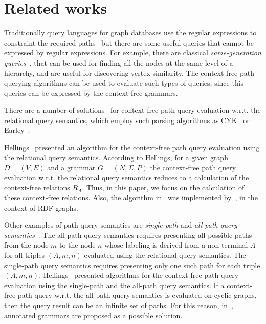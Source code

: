 \section{Related works} \label{section_related}
Traditionally query languages for graph databases use the regular expressions to constraint the required paths~\cite{reutter2017regular, fan2011adding, abiteboul1997regular, nole2016regular, graphDB} but there are some useful queries that cannot be expressed by regular expressions. For example, there are classical \textit{same-generation queries}~\cite{FndDB}, that can be used for finding all the nodes at the same level of a hierarchy, and are useful for discovering vertex similarity. The context-free path querying algorithms can be used to evaluate such types of queries, since this queries can be expressed by the context-free grammars.  

There are a number of solutions~\cite{hellingsRelational, GraphQueryWithEarley, RDF} for context-free path query evaluation w.r.t. the relational query semantics, which employ such parsing algorithms as CYK~\cite{kasami, younger} or Earley~\cite{Grune}.

Hellings~\cite{hellingsRelational} presented an algorithm for the context-free path query evaluation using the relational query semantics. According to Hellings, for a given graph $D = (V, E)$ and a grammar $G = (N, \Sigma, P)$ the context-free path query evaluation w.r.t. the relational query semantics reduces to a calculation of the context-free relations $R_A$. Thus, in this paper, we focus on the calculation of these context-free relations. Also, the algorithm in~\cite{hellingsRelational} was implemented by~\cite{RDF}, in the context of RDF graphs.

Other examples of path query semantics are \textit{single-path} and \textit{all-path query semantics}~\cite{hellingsPathQuerying}. The all-path query semantics requires presenting all possible paths from the node $m$ to the node $n$ whose labeling is derived from a non-terminal $A$ for all triples $(A, m, n)$ evaluated using the relational query semantics. The single-path query semantics requires presenting only one such path for each triple $(A, m, n)$. Hellings~\cite{hellingsPathQuerying} presented algorithms for the context-free path query evaluation using the single-path and the all-path query semantics. If a context-free path query w.r.t. the all-path query semantics is evaluated on cyclic graphs, then the query result can be an infinite set of paths. For this reason, in~\cite{hellingsPathQuerying}, annotated grammars are proposed as a possible solution.

